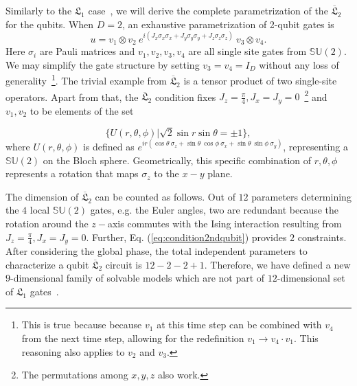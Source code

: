 \documentclass[aps,prx,twocolumn,notitlepage,nofootinbib,nobalancelastpage]{revtex4-2}
\theoremstyle{break}
\newcommand{\1}{\mathbbm{1}}
\theoremstyle{plain}
\theoremstyle{plain}
\theoremstyle{plain}
\begin{document}
Similarly to the $\mathfrak{L}_1$ case~\cite{bertini2019exact},
we will derive the complete parametrization of the $\overline{\mathfrak{L}}_2$ for the qubits. When $D=2$,
an exhaustive parametrization of 2-qubit gates is
\begin{equation}
u=v_{1}\otimes v_{2} \ e^{i(J_{x}\sigma_{x}\sigma_{x}+J_{y}\sigma_{y}\sigma_{y}+J_{z}\sigma_{z}\sigma_{z})} \ v_{3}\otimes v_{4}.
\label{eq:parameter2qubit}\end{equation}
Here $\sigma_i$ are Pauli matrices and $v_{1},v_{2},v_{3},v_{4}$ are all single site
gates from $\mathbb{SU}(2)$. We may simplify the gate structure by setting $v_{3}=v_{4}=I_{D}$
without any loss of generality~\footnote{This is true because because $v_{1}$ at this time step can be
combined with $v_{4}$ from the next time step, allowing for the redefinition
$v_{1}\to v_{4}\cdot v_{1}$. This reasoning also applies to $v_{2}$ and $v_{3}$.}.
%
The trivial example from $\overline{\mathfrak{L}}_2$ is a tensor product of two single-site operators.
Apart from that, the $\overline{\mathfrak{L}}_2$ 
condition fixes $J_{z}=\frac{\pi}{4},J_{x}=J_{y}=0$~\footnote{The permutations among $x,y,z$ also work.} and $v_{1},v_{2}$ to be elements of the set 

\begin{equation}
\{U(r,\theta,\phi)|\sqrt{2}\sin r\sin\theta=\pm1\}, 
\label{eq:condition2ndqubit}
\end{equation}
where $U(r,\theta,\phi)$ is defined as $e^{ir(\cos\theta \ \sigma_{z}+\sin\theta\ \cos\phi \ \sigma_{x}+\sin\theta \ \sin\phi \ \sigma_{y})}$, 
representing a $\mathbb{SU}(2)$ on the Bloch sphere. Geometrically,
this specific combination of $r,\theta,\phi$ represents a rotation that
maps $\sigma_{z}$ to the $x-y$ plane.


The dimension of $\overline{\mathfrak{L}}_2$ can be counted as follows. Out of $12$ parameters determining the $4$ local $\mathbb{SU}(2)$ gates, e.g. the Euler angles, two are redundant because the rotation around the $z-$axis commutes with the Ising interaction resulting from $J_z=\frac{\pi}{4},J_x=J_y=0$. Further, Eq. (\ref{eq:condition2ndqubit}) provides $2$ constraints. After considering the global phase, the total independent parameters to characterize a qubit $\overline{\mathfrak{L}}_2$ circuit is $12-2-2+1$. Therefore, we have defined a new $9$-dimensional %
family of solvable models which are not part of $12$-dimensional set of $\mathfrak{L}_1$ gates~\cite{prosen2021manybody}.
\end{document}
